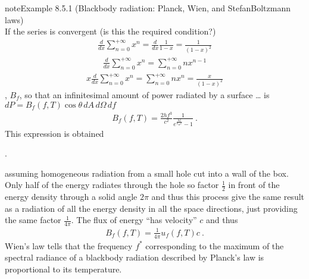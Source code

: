 \documentclass[letterpaper,10pt,english]{jupyterBook}
\begin{document}
\begin{sphinxadmonition}{note}{Example 8.5.1 (Black\sphinxhyphen{}body radiation: Planck, Wien, and Stefan\sphinxhyphen{}Boltzmann laws)}
\begin{equation*}
\end{equation*}
\sphinxAtStartPar
{} If the series is convergent (is this the required condition?)
\begin{equation*}
\begin{split}\frac{d}{d x} \sum_{n=0}^{+\infty} x^n = \frac{d}{dx} \frac{1}{1 - x} = \frac{1}{(1-x)^2}\end{split}
\end{equation*}\begin{equation*}
\begin{split}\frac{d}{d x} \sum_{n=0}^{+\infty} x^n = \sum_{n=0}^{+\infty} n x^{n-1}\end{split}
\end{equation*}\begin{equation*}
\begin{split}x \frac{d}{d x} \sum_{n=0}^{+\infty} x^n = \sum_{n=0}^{+\infty} n x^n = \frac{x}{(1-x)^2}\end{split}
\end{equation*}
\sphinxAtStartPar
{}, \(B_{f}\), so that an infinitesimal amount of power radiated by a surface … is \(d P = B_f(f,T) \cos \theta \, dA \, d\Omega \, d f\)
\begin{equation*}
\begin{split}B_{f}(f, T) = \frac{2 h f^3}{c^2}\frac{1}{e^{\frac{hf}{k_B T}} - 1} \ .\end{split}
\end{equation*}
\sphinxAtStartPar
This expression is obtained%
\begin{footnote}[1]\sphinxAtStartFootnote
{}.
%
\end{footnote} assuming homogeneous radiation from a small hole cut into a wall of the box. Only half of the energy radiates through the hole \sphinxhyphen{} so factor \(\frac{1}{2}\) in front of the energy density \sphinxhyphen{} through a solid angle \(2 \pi\) \sphinxhyphen{} and thus this process give the same result as a radiation of all the energy density in all the space directions, just providing the same factor \(\frac{1}{4 \pi}\). The flux of energy “has velocity” \(c\) and thus
\begin{equation*}
\begin{split}B_{f}(f, T) = \frac{1}{4 \pi} u_{f}(f,T) c \ .\end{split}
\end{equation*}
\sphinxAtStartPar
{} Wien’s law tells that the frequency \(f^*\) corresponding to the maximum of the spectral radiance of a black\sphinxhyphen{}body radiation described by Planck’s law is proportional to its temperature.


\end{sphinxadmonition}
\end{document}
